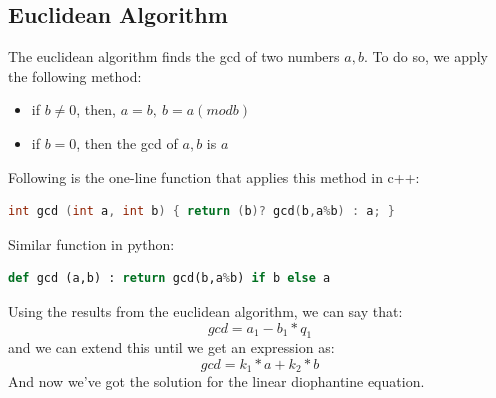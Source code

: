 \documentclass[11pt,twoside]{article}
\theoremstyle{defi}
\begin{document}
\subsection{Euclidean Algorithm}
\begin{definitionii}
The euclidean algorithm finds the gcd of two numbers $a,b$. To do so, we apply the following method:
\end{definitionii}
\begin{itemize}
\item if $b \neq 0$, then, $a=b,\ b=a (mod b)$
\item if $b = 0$, then the gcd of $a,b$ is $a$
\end{itemize}
Following is the one-line function that applies this method in c++:
\begin{lstlisting}[language=C++]
int gcd (int a, int b) { return (b)? gcd(b,a%b) : a; }
\end{lstlisting}
Similar function in python:
\begin{lstlisting}[language=python]
def gcd (a,b) : return gcd(b,a%b) if b else a
\end{lstlisting}

Using the results from the euclidean algorithm, we can say that:
$$ gcd = a_1-b_1*q_1 $$
and we can extend this until we get an expression as:
$$ gcd = k_1 * a + k_2 * b$$
And now we've got the solution for the linear diophantine equation.

\newpage
\end{document}
